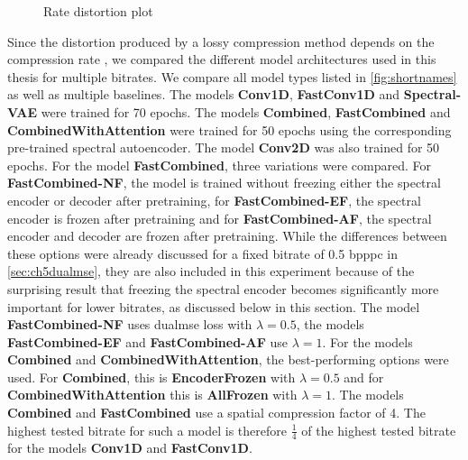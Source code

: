 \begin{figure}[!ht]
\caption{Rate distortion plot}
\label{fig:ratedistortion}
\end{figure}

Since the distortion produced by a lossy compression method depends on the compression rate \citep{berger_rate-distortion_2003}, we compared the different model architectures used in this thesis for multiple bitrates. We compare all model types listed in \autoref{fig:shortnames} as well as multiple baselines. The models \textbf{Conv1D}, \textbf{FastConv1D} and \textbf{Spectral-VAE} were trained for 70 epochs. The models \textbf{Combined}, \textbf{FastCombined} and \textbf{CombinedWithAttention} were trained for 50 epochs using the corresponding pre-trained spectral autoencoder. The model \textbf{Conv2D} was also trained for 50 epochs. For the model \textbf{FastCombined}, three variations were compared. For \textbf{FastCombined-NF}, the model is trained without freezing either the spectral encoder or decoder after pretraining, for \textbf{FastCombined-EF}, the spectral encoder is frozen after pretraining and for \textbf{FastCombined-AF}, the spectral encoder and decoder are frozen after pretraining. While the differences between these options were already discussed for a fixed bitrate of 0.5 bpppc in \autoref{sec:ch5dualmse}, they are also included in this experiment because of the surprising result that freezing the spectral encoder becomes significantly more important for lower bitrates, as discussed below in this section. The model \textbf{FastCombined-NF} uses \ac{dualmse} loss with $\lambda=0.5$, the models \textbf{FastCombined-EF} and \textbf{FastCombined-AF} use $\lambda=1$. For the models \textbf{Combined} and \textbf{CombinedWithAttention}, the best-performing options were used. For \textbf{Combined}, this is \textbf{EncoderFrozen} with $\lambda=0.5$ and for \textbf{CombinedWithAttention} this is \textbf{AllFrozen} with $\lambda=1$. The models \textbf{Combined} and \textbf{FastCombined} use a spatial compression factor of 4. The highest tested bitrate for such a model is therefore $\frac{1}{4}$ of the highest tested bitrate for the models \textbf{Conv1D} and \textbf{FastConv1D}.

